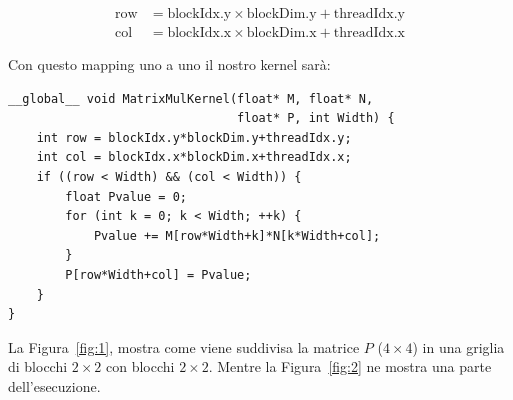 \documentclass[a4paper]{article}
\begin{document}
\[
    \begin{aligned}
        \text{row} & = \text{blockIdx.y} \times \text{blockDim.y} + \text{threadIdx.y} \\
        \text{col} & = \text{blockIdx.x} \times \text{blockDim.x} + \text{threadIdx.x}
    \end{aligned}
\]

Con questo mapping uno a uno il nostro kernel sarà:

\begin{lstlisting}[caption={Kernel CUDA con memoria globale}, label={lst:1}]
__global__ void MatrixMulKernel(float* M, float* N,
                                float* P, int Width) {
    int row = blockIdx.y*blockDim.y+threadIdx.y;
    int col = blockIdx.x*blockDim.x+threadIdx.x;
    if ((row < Width) && (col < Width)) {
        float Pvalue = 0;
        for (int k = 0; k < Width; ++k) {
            Pvalue += M[row*Width+k]*N[k*Width+col];
        }
        P[row*Width+col] = Pvalue;
    }
}
\end{lstlisting}

\newpage

La Figura~\ref{fig:1}, mostra come viene suddivisa la matrice $P$ ($4\times{4}$) in una griglia di blocchi $2\times{2}$ con blocchi $2\times{2}$. Mentre la Figura~\ref{fig:2} ne mostra una parte dell'esecuzione.
\end{document}
